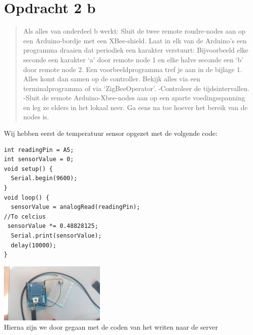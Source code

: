 \documentclass[12pt]{article}
\begin{document}
\section*{Opdracht 2 b}
\begin{quote}
Als alles van onderdeel b werkt: Sluit de twee remote roudre-nodes aan op een Arduino-bordje met een XBee-shield. Laat in elk van de Arduino’s een programma draaien dat periodiek een karakter verstuurt: Bijvoorbeeld elke seconde een karakter ‘a’ door remote node 1 en elke halve seconde een ‘b’ door remote node 2. Een voorbeeldprogramma tref je aan in de bijlage 1. Alles komt dan samen op de controller. Bekijk alles via een terminalprogramma of via ‘ZigBeeOperator’. -Controleer de tijdsintervallen. -Sluit de remote Arduino-Xbee-nodes aan op een aparte voedingsspanning en leg ze elders in het lokaal neer. Ga eens na toe hoever het bereik van de nodes is.
\end{quote}
Wij hebben eerst de temperatuur sensor opgezet met de volgende code:
\begin{lstlisting}
int readingPin = A5;
int sensorValue = 0;
void setup() {
  Serial.begin(9600);
}
void loop() {
  sensorValue = analogRead(readingPin);
//To celcius 
 sensorValue *= 0.48828125;
  Serial.print(sensorValue);
  delay(10000);
}
\end{lstlisting}
\includegraphics[scale=1] {foto2}\\
Hierna zijn we door gegaan met de coden van het writen naar de server
\\
\newpage
\end{document}
